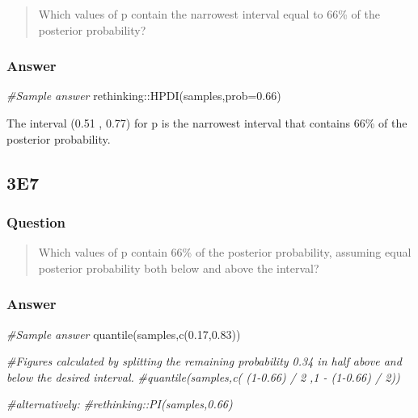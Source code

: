 \documentclass[
]{book}
\newenvironment{Shaded}{\begin{snugshade}}{\end{snugshade}}
\newcommand{\AttributeTok}[1]{\textcolor[rgb]{0.77,0.63,0.00}{#1}}
\newcommand{\CommentTok}[1]{\textcolor[rgb]{0.56,0.35,0.01}{\textit{#1}}}
\newcommand{\FloatTok}[1]{\textcolor[rgb]{0.00,0.00,0.81}{#1}}
\newcommand{\FunctionTok}[1]{\textcolor[rgb]{0.00,0.00,0.00}{#1}}
\newcommand{\NormalTok}[1]{#1}
\newcommand{\SpecialCharTok}[1]{\textcolor[rgb]{0.00,0.00,0.00}{#1}}
\begin{document}
\begin{quote}
Which values of p contain the narrowest interval equal to 66\% of the posterior probability?
\end{quote}

\hypertarget{answer-20}{%
\subsubsection*{Answer}\label{answer-20}}

\begin{Shaded}
\begin{Highlighting}[]
\CommentTok{\#Sample answer}
\NormalTok{rethinking}\SpecialCharTok{::}\FunctionTok{HPDI}\NormalTok{(samples,}\AttributeTok{prob=}\FloatTok{0.66}\NormalTok{)}
\end{Highlighting}
\end{Shaded}

The interval (0.51 , 0.77) for p is the narrowest interval that contains 66\% of the posterior probability.

\hypertarget{e7}{%
\subsection*{3E7}\label{e7}}

\hypertarget{question-21}{%
\subsubsection*{Question}\label{question-21}}

\begin{quote}
Which values of p contain 66\% of the posterior probability, assuming equal posterior probability both below and above the interval?
\end{quote}

\hypertarget{answer-21}{%
\subsubsection*{Answer}\label{answer-21}}

\begin{Shaded}
\begin{Highlighting}[]
\CommentTok{\#Sample answer}
\FunctionTok{quantile}\NormalTok{(samples,}\FunctionTok{c}\NormalTok{(}\FloatTok{0.17}\NormalTok{,}\FloatTok{0.83}\NormalTok{))}

\CommentTok{\#Figures calculated by splitting the remaining probability 0.34 in half above and below the desired interval.}
\CommentTok{\#quantile(samples,c( (1{-}0.66) / 2 ,1 {-} (1{-}0.66) / 2))}

\CommentTok{\#alternatively:}
\CommentTok{\#rethinking::PI(samples,0.66)}
\end{Highlighting}
\end{Shaded}
\end{document}
